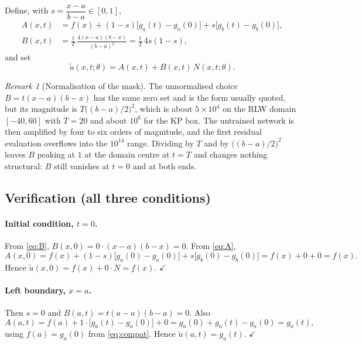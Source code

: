 \documentclass[11pt,a4paper]{article}
\theoremstyle{remark}
\newtheorem{remark}{Remark}
\newcommand{\ut}{\tilde{u}}
\begin{document}
Define, with $s = \dfrac{x-a}{b-a} \in [0,1]$,
\begin{align}
A(x,t) &= f(x) + (1-s)\big[g_a(t)-g_a(0)\big] + s\big[g_b(t)-g_b(0)\big],
\label{eq:A}\\
B(x,t) &= \frac{t}{T}\,\frac{4(x-a)(b-x)}{(b-a)^2}
= \frac{t}{T}\,4s(1-s),
\label{eq:B}
\end{align}
and set
\begin{equation}
\boxed{\ \ut(x,t;\theta) = A(x,t) + B(x,t)\,N(x,t;\theta). \ }
\label{eq:hardbc}
\end{equation}

\begin{remark}[Normalisation of the mask]
The unnormalised choice $B = t(x-a)(b-x)$ has the same zero set and is the
form usually quoted, but its magnitude is $T\big((b-a)/2\big)^2$, which is
about $5\times10^4$ on the RLW domain $[-40,60]$ with $T=20$ and about
$10^6$ for the KP box. The untrained network is then amplified by four to six
orders of magnitude, and the first residual evaluation overflows into the
$10^{14}$ range. Dividing by $T$ and by $\big((b-a)/2\big)^2$ leaves $B$
peaking at $1$ at the domain centre at $t=T$ and changes nothing structural:
$B$ still vanishes at $t=0$ and at both ends.
\end{remark}

\subsection{Verification (all three conditions)}

\paragraph{Initial condition, $t=0$.}
From \eqref{eq:B}, $B(x,0) = 0\cdot(x-a)(b-x) = 0$. From \eqref{eq:A},
\begin{equation}
A(x,0) = f(x) + (1-s)\big[g_a(0)-g_a(0)\big] + s\big[g_b(0)-g_b(0)\big]
= f(x) + 0 + 0 = f(x).
\end{equation}
Hence $\ut(x,0) = f(x) + 0\cdot N = f(x)$. \hfill$\checkmark$

\paragraph{Left boundary, $x=a$.}
Then $s = 0$ and $B(a,t) = t(a-a)(b-a) = 0$. Also
\begin{equation}
A(a,t) = f(a) + 1\cdot\big[g_a(t)-g_a(0)\big] + 0 = g_a(0) + g_a(t) - g_a(0) = g_a(t),
\end{equation}
using $f(a)=g_a(0)$ from \eqref{eq:compat}. Hence $\ut(a,t) = g_a(t)$. \hfill$\checkmark$
\end{document}
